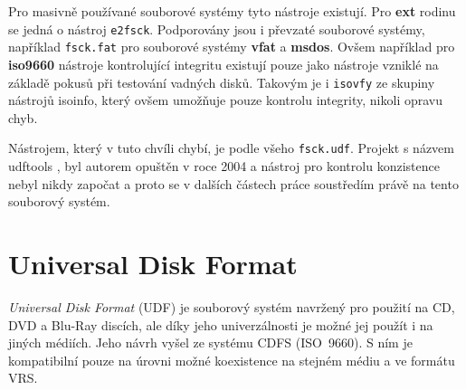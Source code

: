 Pro masivně používané souborové systémy tyto nástroje existují. Pro \textbf{ext} rodinu se jedná o nástroj \texttt{e2fsck}. Podporovány jsou i převzaté souborové systémy, například \texttt{fsck.fat} pro souborové systémy \textbf{vfat} a \textbf{msdos}. Ovšem například pro \textbf{iso9660} nástroje kontrolující integritu existují pouze jako nástroje vzniklé na základě pokusů při testování vadných disků. Takovým je i \texttt{isovfy} \cite{man-isovfy} ze skupiny nástrojů isoinfo, který ovšem umožňuje pouze kontrolu integrity, nikoli opravu chyb.

Nástrojem, který v tuto chvíli chybí, je podle všeho \texttt{fsck.udf}. Projekt s názvem udftools \cite{udftools-sourceforge}, byl autorem opuštěn v roce 2004 a nástroj pro kontrolu konzistence nebyl nikdy započat a proto se v dalších částech práce soustředím právě na tento souborový systém. 

\chapter{Universal Disk Format}
\label{ch:udf}
\textit{Universal Disk Format} (UDF) je souborový systém navržený pro použití na CD, DVD a Blu-Ray discích, ale díky jeho univerzálnosti je možné jej použít i na jiných médiích. Jeho návrh vyšel ze systému CDFS (ISO~9660). S ním je kompatibilní pouze na úrovni možné koexistence na stejném médiu a ve formátu VRS.

